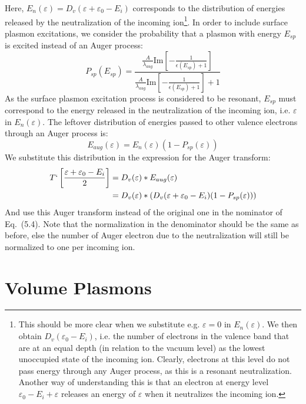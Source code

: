 \begin{refsection}
Here, $E_{n}(\varepsilon) = D_v(\varepsilon + \varepsilon_0 - E_i)$ corresponds to the distribution of energies released by the neutralization of the incoming ion\footnote{This should be more clear when we substitute e.g. $\varepsilon = 0$ in $E_{n}(\varepsilon)$. We then obtain $D_v(\varepsilon_0 - E_i)$, i.e. the number of electrons in the valence band that are at an equal depth (in relation to the vacuum level) as the lowest unoccupied state of the incoming ion. Clearly, electrons at this level do not pass energy through any Auger process, as this is a resonant neutralization. Another way of understanding this is that an electron at energy level $\varepsilon_0 - E_i + \varepsilon$ releases an energy of $\varepsilon$ when it neutralizes the incoming ion.}.  In order to include surface plasmon excitations, we consider the probability that a plasmon with energy $E_{sp}$ is excited instead of an Auger process:
\begin{equation}
P_{sp}(E_{sp}) = \frac{ \frac{A}{\lambda_{aug}} \text{Im}\left[-\frac{1}{\epsilon(E_{sp}) + 1}\right]}{\frac{A}{\lambda_{aug}} \text{Im}\left[-\frac{1}{\epsilon(E_{sp}) + 1}\right] + 1}
\end{equation}
As the surface plasmon excitation process is considered to be resonant, $E_{sp}$ must correspond to the energy released in the neutralization of the incoming ion, i.e. $\varepsilon$ in $E_{n}(\varepsilon)$. The leftover distribution of energies passed to other valence electrons through an Auger process is:
\begin{equation}
    E_{aug}(\varepsilon) = E_{n}(\varepsilon) (1 - P_{sp}(\varepsilon))
\end{equation}
We substitute this distribution in the expression for the Auger transform:
\begin{equation}
\begin{aligned}
T`\left[\frac{\varepsilon + \varepsilon_0 - E_i}{2}\right] &= D_v(\varepsilon) * E_{aug}(\varepsilon) \\ &= D_v(\varepsilon) * (D_v(\varepsilon + \varepsilon_0 - E_i) (1 - P_{sp}(\varepsilon)))
\end{aligned}
\end{equation}
And use this Auger transform instead of the original one in the nominator of Eq.~(5.4). Note that the normalization in the denominator should be the same as before, else the number of Auger electron due to the neutralization will still be normalized to one per incoming ion.

\section{Volume Plasmons}


\end{refsection}
